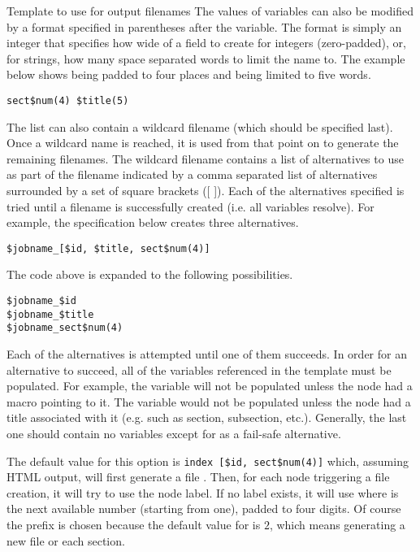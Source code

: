 \begin{configuration}{Template to use for output filenames}
The values of variables can also be modified by a format specified
in parentheses after the variable.  The format is simply an integer
that specifies how wide of a field to create for integers
(zero-padded), or, for strings, how many space separated words
to limit the name to.  The example below shows  being padded
to four places and  being limited to five words.

\begin{verbatim}
sect$num(4) $title(5)
\end{verbatim}

The list can also contain a wildcard filename (which should be
specified last).  Once a wildcard name is reached, it is
used from that point on to generate the remaining filenames.
The wildcard filename contains a list of alternatives to use as
part of the filename indicated by a comma separated list of
alternatives surrounded by a set of square brackets ([ ]).
Each of the alternatives specified is tried until a filename is
successfully created (i.e. all variables resolve).  For example,
the specification below creates three alternatives.

\begin{verbatim}
$jobname_[$id, $title, sect$num(4)]
\end{verbatim}

The code above is expanded to the following possibilities.

\begin{verbatim}
$jobname_$id
$jobname_$title
$jobname_sect$num(4)
\end{verbatim}

Each of the alternatives is attempted until one of them succeeds.
In order for an alternative to succeed, all of the variables referenced
in the template must be populated.  For example, the  variable
will not be populated unless the node had a  macro
pointing to it.  The  variable would not be populated unless
the node had a title associated with it (e.g. such as section, subsection, etc.).
Generally, the last one should contain no variables except for
 as a fail-safe alternative.

The default value for this option is \verb+index [$id, sect$num(4)]+
which, assuming HTML output, will first generate a file
. Then, for each node triggering a file creation, it
will try to use the node label. If no label exists, it will use
 where  is the next available number (starting
from one), padded to four digits. Of course the prefix  is
chosen because the default value for  is $2$, which
means generating a new file or each section.


\end{configuration}
